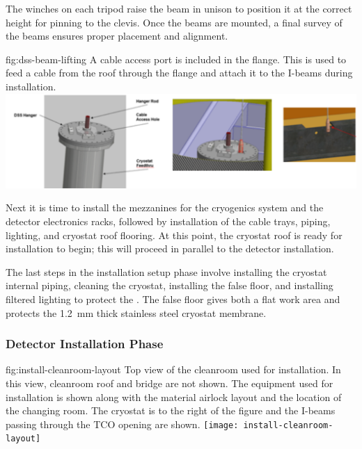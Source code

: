 The winches on each tripod raise the beam in unison to position it at the correct height for pinning to the \fdth clevis.  Once the beams are mounted, a final survey of the beams ensures proper placement and alignment. 
 \begin{dunefigure}{fig:dss-beam-lifting}
  {A cable access port is included in the  flange. This is used to feed a cable from the roof through the flange and attach it to the I-beams during  installation.}
 \includegraphics[width=.95\textwidth]{graphics/dss-beam-lifting.pdf}
\end{dunefigure}

Next it is time to install the mezzanines for the cryogenics system and the detector electronics racks, followed by installation of the cable trays,  piping, lighting, and cryostat roof flooring. At this point, the cryostat roof is ready for  installation to begin; this will proceed in parallel to the detector installation.

The last steps in the installation setup phase involve installing the cryostat internal piping, cleaning the cryostat, installing the false floor, and installing filtered lighting to protect the .   The false floor gives both a flat work area and protects the \SI{1.2}{mm} thick stainless steel cryostat membrane. 


\subsubsection{Detector Installation Phase}
\label{sec:fdsp-tc-inst-execute}

\begin{dunefigure}{fig:install-cleanroom-layout}
  {Top view of the cleanroom used for installation. In this view, cleanroom roof and bridge are not shown. The equipment used for installation is shown along with the material airlock layout and the location of the changing room. The cryostat is to the right of the figure and the I-beams passing through the TCO opening are shown.}
 \texttt{[image: install-cleanroom-layout]}
\end{dunefigure}

